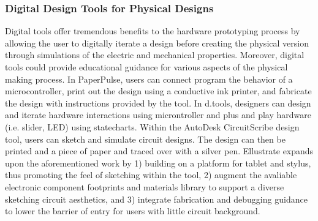 \documentclass{sigchi}
\begin{document}
\subsubsection{Digital Design Tools for Physical Designs}
Digital tools offer tremendous benefits to the hardware prototyping process by allowing the user to digitally iterate a design before creating the physical version through simulations of the electric and mechanical properties. Moreover, digital tools could provide educational guidance for various aspects of the physical making process. In PaperPulse, users can connect program the behavior of a microcontroller, print out the design using a conductive ink printer, and fabricate the design with instructions provided by the tool. In d.tools, designers can design and iterate hardware interactions using microntroller and plus and play hardware (i.e. slider, LED) using statecharts. Within the AutoDesk CircuitScribe design tool, users can sketch and simulate circuit designs. The design can then be printed and a piece of paper and traced over with a silver pen. Ellustrate expands upon the aforementioned work by 1) building on a platform for tablet and stylus, thus promoting the feel of sketching within the tool, 2) augment the avaliable electronic component footprints and materials library to support a diverse sketching circuit aesthetics, and 3) integrate fabrication and debugging guidance to lower the barrier of entry for users with little circuit background.







\end{document}
